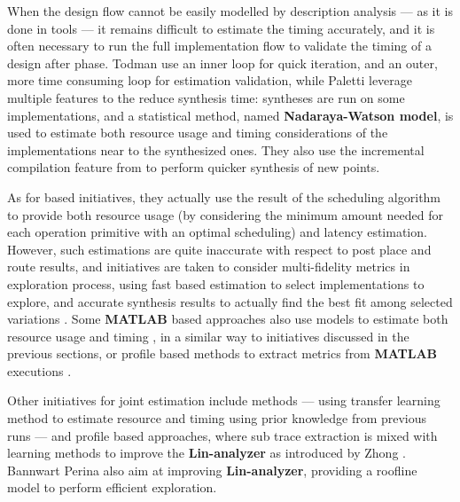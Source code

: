             When the design flow cannot be easily modelled by description analysis --- as it is done in  tools --- it remains difficult to estimate the timing accurately, and it is often necessary to run the full implementation flow to validate the timing of a design after  phase.
            Todman \etal{} \cite{todman_reconfigurable_2012} use an inner loop for quick iteration, and an outer, more time consuming loop for estimation validation, while Paletti \etal{} \cite{paletti_dovado_2021} leverage multiple features to the reduce synthesis time: syntheses are run on some implementations, and a statistical method, named {\bf Nadaraya-Watson model}, is used to estimate both resource usage and timing considerations of the implementations near to the synthesized ones.
            They also use the incremental compilation feature from \vivado{} to perform quicker synthesis of new points.

            As for  based initiatives, they actually use the result of the scheduling algorithm to provide both resource usage (by considering the minimum amount needed for each operation primitive with an optimal scheduling) and latency estimation. 
            However, such estimations are quite inaccurate with respect to post place and route results, and initiatives are taken to consider multi-fidelity metrics in exploration process, using fast  based estimation to select implementations to explore, and accurate synthesis results to actually find the best fit among selected variations \cite{lo_multi-fidelity_2018}.
            Some {\bf MATLAB} based approaches also use models to estimate both resource usage and timing \cite{hutchison_system_2004}, in a similar way to initiatives discussed in the previous sections, or profile based methods to extract metrics from {\bf MATLAB} executions \cite{bjureus_fpga_2002}.

            Other initiatives for joint estimation include  methods --- \eg using transfer learning method to estimate resource and timing using prior knowledge from previous  runs \cite{kwon_transfer_2020} --- and profile based approaches, where sub trace extraction is mixed with learning methods \cite{zhong_design_2017} to improve the {\bf Lin-analyzer} as introduced by Zhong \etal{} \cite{zhong_lin-analyzer_2016}.
            Bannwart Perina \etal{} \cite{bannwart_perina_fast_2021} also aim at improving {\bf Lin-analyzer}, providing a roofline model to perform efficient exploration.

